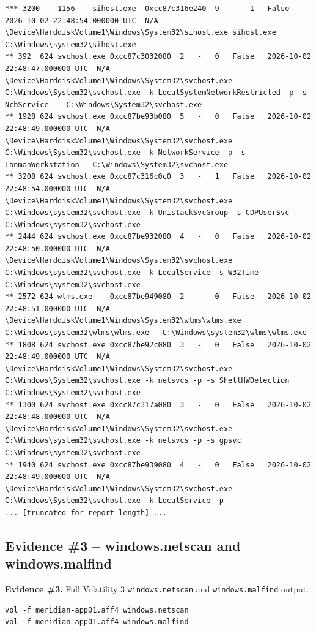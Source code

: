 \documentclass[11pt,letterpaper]{article}
\newcommand{\labstep}[1]{%
  \Needspace{6\baselineskip}%
  \subsection*{#1}%
  \nopagebreak
}
\newcommand{\evidencebox}[2]{%
  \par\vspace{0.25em}%
  \noindent\colorbox{okbox}{\parbox{\dimexpr\linewidth-2\fboxsep\relax}{%
    \textbf{Evidence \#{#1}.} #2}}%
  \par\vspace{0.25em}%
}
\begin{document}
\begin{lstlisting}
*** 3200	1156	sihost.exe	0xcc87c316e240	9	-	1	False	2026-10-02 22:48:54.000000 UTC	N/A	\Device\HarddiskVolume1\Windows\System32\sihost.exe	sihost.exe	C:\Windows\system32\sihost.exe
** 392	624	svchost.exe	0xcc87c3032080	2	-	0	False	2026-10-02 22:48:47.000000 UTC	N/A	\Device\HarddiskVolume1\Windows\System32\svchost.exe	C:\Windows\System32\svchost.exe -k LocalSystemNetworkRestricted -p -s NcbService	C:\Windows\System32\svchost.exe
** 1928	624	svchost.exe	0xcc87be93b080	5	-	0	False	2026-10-02 22:48:49.000000 UTC	N/A	\Device\HarddiskVolume1\Windows\System32\svchost.exe	C:\Windows\System32\svchost.exe -k NetworkService -p -s LanmanWorkstation	C:\Windows\System32\svchost.exe
** 3208	624	svchost.exe	0xcc87c316c0c0	3	-	1	False	2026-10-02 22:48:54.000000 UTC	N/A	\Device\HarddiskVolume1\Windows\System32\svchost.exe	C:\Windows\system32\svchost.exe -k UnistackSvcGroup -s CDPUserSvc	C:\Windows\system32\svchost.exe
** 2444	624	svchost.exe	0xcc87be932080	4	-	0	False	2026-10-02 22:48:50.000000 UTC	N/A	\Device\HarddiskVolume1\Windows\System32\svchost.exe	C:\Windows\system32\svchost.exe -k LocalService -s W32Time	C:\Windows\system32\svchost.exe
** 2572	624	wlms.exe	0xcc87be949080	2	-	0	False	2026-10-02 22:48:51.000000 UTC	N/A	\Device\HarddiskVolume1\Windows\System32\wlms\wlms.exe	C:\Windows\system32\wlms\wlms.exe	C:\Windows\system32\wlms\wlms.exe
** 1808	624	svchost.exe	0xcc87be92c080	3	-	0	False	2026-10-02 22:48:49.000000 UTC	N/A	\Device\HarddiskVolume1\Windows\System32\svchost.exe	C:\Windows\System32\svchost.exe -k netsvcs -p -s ShellHWDetection	C:\Windows\System32\svchost.exe
** 1300	624	svchost.exe	0xcc87c317a080	3	-	0	False	2026-10-02 22:48:48.000000 UTC	N/A	\Device\HarddiskVolume1\Windows\System32\svchost.exe	C:\Windows\system32\svchost.exe -k netsvcs -p -s gpsvc	C:\Windows\system32\svchost.exe
** 1940	624	svchost.exe	0xcc87be939080	4	-	0	False	2026-10-02 22:48:49.000000 UTC	N/A	\Device\HarddiskVolume1\Windows\System32\svchost.exe	C:\Windows\System32\svchost.exe -k LocalService -p 
... [truncated for report length] ...

\end{lstlisting}

\labstep{Evidence \#3 -- windows.netscan and windows.malfind}

\evidencebox{3}{Full Volatility 3 \texttt{windows.netscan} and \texttt{windows.malfind} output.}

\begin{lstlisting}
vol -f meridian-app01.aff4 windows.netscan
vol -f meridian-app01.aff4 windows.malfind
\end{lstlisting}
\end{document}
